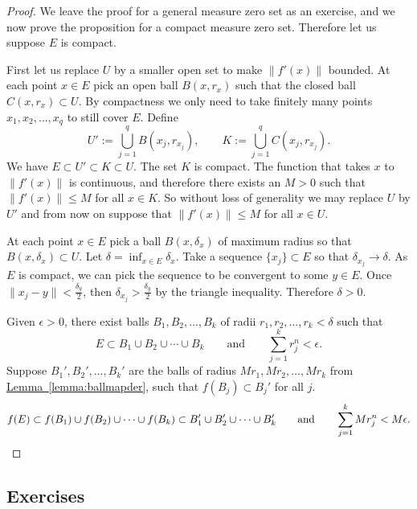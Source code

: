 \documentclass[12pt]{book}
\newcommand{\snorm}[1]{\lVert {#1} \rVert}
\theoremstyle{plain}
\theoremstyle{remark}
\theoremstyle{definition}
\theoremstyle{exercise}
\theoremstyle{example}
\newcommand{\lemmaref}[1]{\hyperref[#1]{Lemma~\ref*{#1}}}
\begin{document}
\begin{proof}
We leave the proof for a general measure zero set as an exercise, and we
now prove the proposition for a compact measure zero set.  Therefore let us 
suppose $E$ is compact.

First let us replace $U$ by a smaller open set to make $\snorm{f'(x)}$ bounded.
At each point $x \in
E$ pick an open ball $B(x,r_x)$ such that the closed ball $C(x,r_x) \subset
U$.  By compactness we only need to take finitely
many points $x_1,x_2,\ldots,x_q$ to still cover $E$.  Define
\begin{equation*}
U' := \bigcup_{j=1}^q B(x_j,r_{x_j}), \qquad
K := \bigcup_{j=1}^q C(x_j,r_{x_j}).
\end{equation*}
We have $E \subset U' \subset K \subset U$.  The set $K$ is compact.
The function that takes $x$ to $\snorm{f'(x)}$ is continuous, and therefore
there exists an $M > 0$ such that $\snorm{f'(x)} \leq M$ for all $x \in K$.
So without loss of generality we may replace $U$ by $U'$ and from now on
suppose that $\snorm{f'(x)} \leq M$ for all $x \in U$.

At each point $x \in E$ pick a ball $B(x,\delta_x)$ of maximum radius 
so that $B(x,\delta_x) \subset U$.  Let $\delta = \inf_{x\in E} \delta_x$.
Take a sequence $\{ x_j \} \subset E$ so that $\delta_{x_j} \to \delta$.
As $E$ is compact, we can pick the sequence to be convergent to some $y \in
E$.  Once $\snorm{x_j-y} < \frac{\delta_y}{2}$, then
$\delta_{x_j} > \frac{\delta_y}{2}$ by the triangle inequality.
Therefore $\delta > 0$.

Given $\epsilon > 0$, there exist balls $B_1,B_2,\ldots,B_k$ of radii
$r_1,r_2,\ldots,r_k < \delta$ such that
\begin{equation*}
E \subset B_1 \cup B_2 \cup \cdots \cup B_k
\qquad \text{and} \qquad
\sum_{j=1}^k r_j^n < \epsilon.
\end{equation*}
Suppose $B_1', B_2', \ldots, B_k'$ are the balls of radius
$Mr_1, Mr_2, \ldots, Mr_k$ from
\lemmaref{lemma:ballmapder}, such that $f(B_j) \subset B_j'$ for all $j$.
\begin{equation*}
f(E) \subset f(B_1) \cup f(B_2) \cup \cdots \cup f(B_k)
\subset B_1' \cup B_2' \cup \cdots \cup B_k'
\qquad \text{and} \qquad
\sum_{j=1}^k Mr_j^n
 < M \epsilon. \qedhere
\end{equation*}
\end{proof}

\subsection{Exercises}
\end{document}
